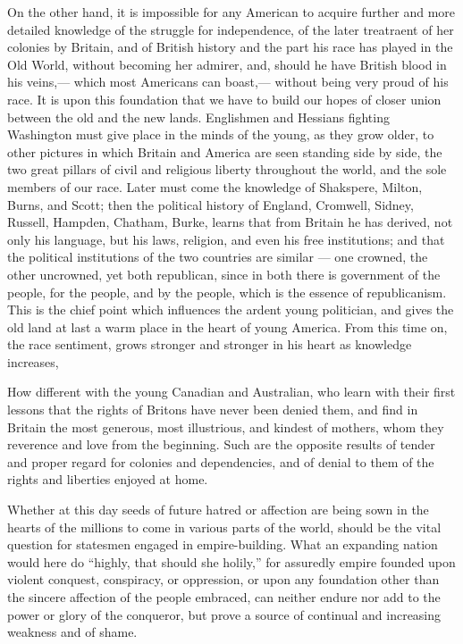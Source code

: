 \documentclass[11pt,openany]{book}
\begin{document}
On the other hand, it is impossible for any American to acquire further and more detailed knowledge of the struggle for independence, of the later treatraent of her colonies by Britain, and of British history and the part his race has played in the Old World, without becoming her admirer, and, should he have British blood in his veins,--- which most Americans can boast,--- without being very proud of his race. It is upon this foundation that we have to build our hopes of closer union between the old and the new lands. Englishmen and Hessians fighting Washington must give place in the minds of the young, as they grow older, to other pictures in which Britain and America are seen standing side by side, the two great pillars of civil and religious liberty throughout the world, and the sole members of our race. Later must come the knowledge of Shakspere, Milton, Burns, and Scott; then the political history of England, Cromwell, Sidney, Russell, Hampden, Chatham, Burke, learns that from Britain he has derived, not only his language, but his laws, religion, and even his free institutions; and that the political institutions of the two countries are similar --- one crowned, the other uncrowned, yet both republican, since in both there is government of the people, for the people, and by the people, which is the essence of republicanism. This is the chief point which influences the ardent young politician, and gives the old land at last a warm place in the heart of young America. From this time on, the race sentiment, grows stronger and stronger in his heart as knowledge increases,

How different with the young Canadian and Australian, who learn with their first lessons that the rights of Britons have never been denied them, and find in Britain the most generous, most illustrious, and kindest of mothers, whom they reverence and love from the beginning. Such are the opposite results of tender and proper regard for colonies and dependencies, and of denial to them of the rights and liberties enjoyed at home.

Whether at this day seeds of future hatred or affection are being sown in the hearts of the millions to come in various parts of the world, should be the vital question for statesmen engaged in empire-building. What an expanding nation would here do ``highly, that should she holily,'' for assuredly empire founded upon violent conquest, conspiracy, or oppression, or upon any foundation other than the sincere affection of the people embraced, can neither endure nor add to the power or glory of the conqueror, but prove a source of continual and increasing weakness and of shame.
\end{document}
